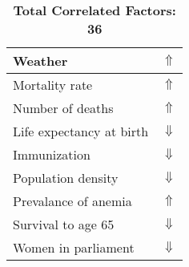 \documentclass[12pt,notitlepage,oneside]{report}
\begin{document}
\begin{table}[!htb]
\begin{tabular}{|l|l|}
Weather & $\Uparrow$\\ \hline
Mortality rate & $\Uparrow$\\ \hline
Number of deaths & $\Uparrow$\\ \hline
Life expectancy at birth & $\Downarrow$\\ \hline
Immunization & $\Downarrow$\\ \hline
Population density & $\Downarrow$\\ \hline
Prevalance of anemia & $\Uparrow$\\ \hline
Survival to age 65 & $\Downarrow$\\ \hline
Women in parliament & $\Downarrow$\\ \hline
\end{tabular}
\caption*{\textbf{Total Correlated Factors: 36}}
\end{table}
\clearpage
\end{document}
